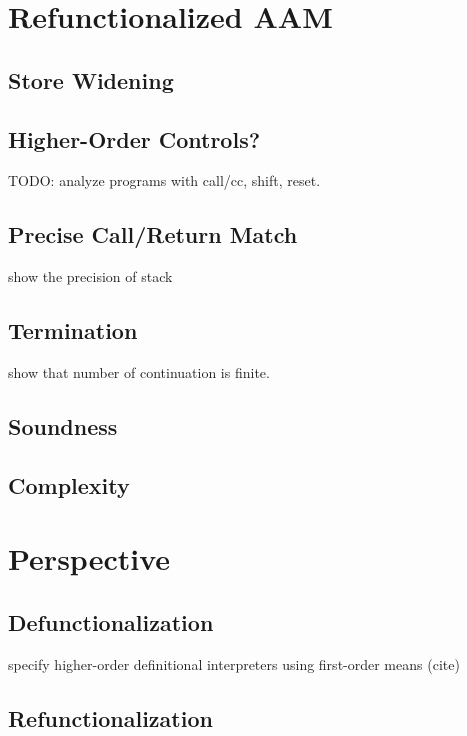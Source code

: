 \documentclass[acmsmall,review,anonymous]{acmart}\settopmatter{printfolios=true,printccs=false,printacmref=false}
\begin{document}
\section{Refunctionalized AAM}

\subsection{Store Widening}

\subsection{Higher-Order Controls?}

TODO: analyze programs with call/cc, shift, reset.

\subsection{Precise Call/Return Match}

show the precision of stack

\subsection{Termination}

show that number of continuation is finite.

\subsection{Soundness}

\subsection{Complexity}

\section{Perspective}

\subsection{Defunctionalization}

specify higher-order definitional interpreters using first-order means (cite)

\subsection{Refunctionalization}
\end{document}
